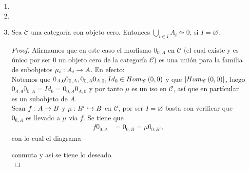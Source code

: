 \documentclass{article}
\begin{document}
\begin{enumerate}[label=\textbf{Ej \arabic*.}]
\begin{proof}
			 conmuta, luego $\delta'$ es tal que $\gamma_1=\beta_1\delta'$ y 
			\begin{equation*}
				\mu\gamma_2=\lrprth{\mu f'}\delta'=\beta_2\delta'.
			\end{equation*}
			Por lo tantto, aplicando la propiedad universal del pull-back a (\ref{pborig}) se tiene que $\delta'=\delta$, con lo cual  se tien que existe un único morfismo $\delta$ tal que el siguiente diagrama conmuta
			\begin{center}
				,
			\end{center}	
		i.e. (\ref{pdpb}) es un pull-back y así se tiene lo deseado.\\
		\end{proof}
		\item
		\item
		\item Sea $\mathscr{C}$ una categoría con objeto cero. Entonces $\bigcup\limits_{i\in I}A_i\simeq 0$, si $I=\varnothing$.
		\begin{proof}
			Afirmamos que en este caso el morfismo $0_{0,A}$  en $\mathscr{C}$ (el cual existe y es único por ser $0$ un objeto cero de la categoría $\mathscr{C}$) es una unión para la familia de subobjetos $\catarrow{\mu_i}{A_i}{A}{}$. En efecto:\\
			Notemos que $0_{A,0}0_{0,A},0_{0,A}0_{A,0},  Id_0\in Hom_{\mathscr{C}}\left(0,0\right)$ y que $\left|Hom_{\mathscr{C}}\left(0,0\right)\right|$, luego $0_{A,0}0_{0,A}=Id_0=0_{0,A}0_{A,0}$ y por tanto $\mu$ es un iso en $\mathscr{C}$, así que en partícular es un subobjeto de $A$.\\
			Sean $\catarrow{f}{A}{B}{}$ y $\catarrow{\mu}{B'}{B}{m}$ en $\mathscr{C}$, por ser $I=\varnothing$ basta con verificar que $0_{0,A}$ es llevado a $\mu$ vía $f$. Se tiene que
			\begin{align*}
				f0_{0,A}&=0_{0,B}=\mu 0_{0,B'},
			\end{align*}
			con lo cual el diagrama
			\begin{center}
			\end{center}
		conmuta y así se tiene lo deseado.\\
		\end{proof}
	

\end{enumerate}
\end{document}
